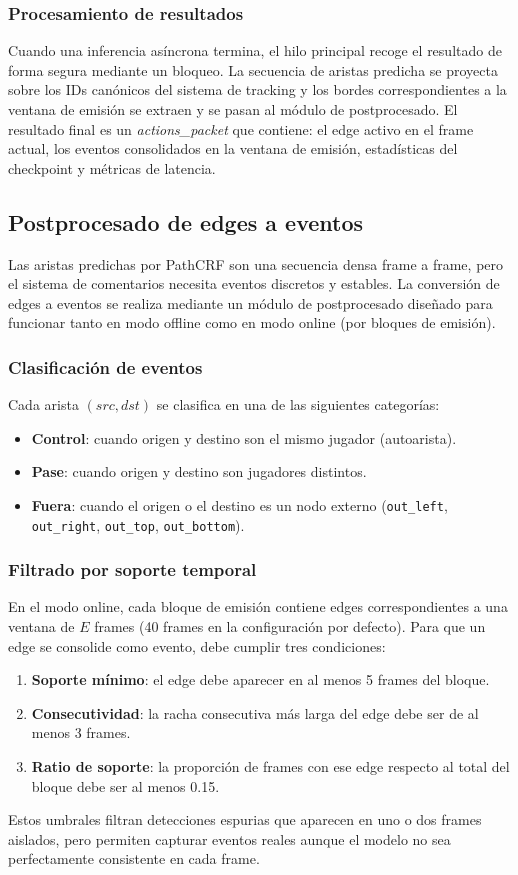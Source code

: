 \subsubsection{Procesamiento de resultados}
Cuando una inferencia asíncrona termina, el hilo principal recoge el resultado de forma segura mediante un bloqueo. La secuencia de aristas predicha se proyecta sobre los IDs canónicos del sistema de tracking y los bordes correspondientes a la ventana de emisión se extraen y se pasan al módulo de postprocesado. El resultado final es un \textit{actions\_packet} que contiene: el edge activo en el frame actual, los eventos consolidados en la ventana de emisión, estadísticas del checkpoint y métricas de latencia.
\subsection{Postprocesado de edges a eventos}
Las aristas predichas por PathCRF son una secuencia densa frame a frame, pero el sistema de comentarios necesita eventos discretos y estables. La conversión de edges a eventos se realiza mediante un módulo de postprocesado diseñado para funcionar tanto en modo offline como en modo online (por bloques de emisión).
\subsubsection{Clasificación de eventos}
Cada arista $(src, dst)$ se clasifica en una de las siguientes categorías:
\begin{itemize}
    \item \textbf{Control}: cuando origen y destino son el mismo jugador (autoarista).
    \item \textbf{Pase}: cuando origen y destino son jugadores distintos.
    \item \textbf{Fuera}: cuando el origen o el destino es un nodo externo (\texttt{out\_left}, \texttt{out\_right}, \texttt{out\_top}, \texttt{out\_bottom}).
\end{itemize}
\subsubsection{Filtrado por soporte temporal}
En el modo online, cada bloque de emisión contiene edges correspondientes a una ventana de $E$ frames (40 frames en la configuración por defecto). Para que un edge se consolide como evento, debe cumplir tres condiciones:
\begin{enumerate}
    \item \textbf{Soporte mínimo}: el edge debe aparecer en al menos 5 frames del bloque.
    \item \textbf{Consecutividad}: la racha consecutiva más larga del edge debe ser de al menos 3 frames.
    \item \textbf{Ratio de soporte}: la proporción de frames con ese edge respecto al total del bloque debe ser al menos 0.15.
\end{enumerate}
Estos umbrales filtran detecciones espurias que aparecen en uno o dos frames aislados, pero permiten capturar eventos reales aunque el modelo no sea perfectamente consistente en cada frame.
